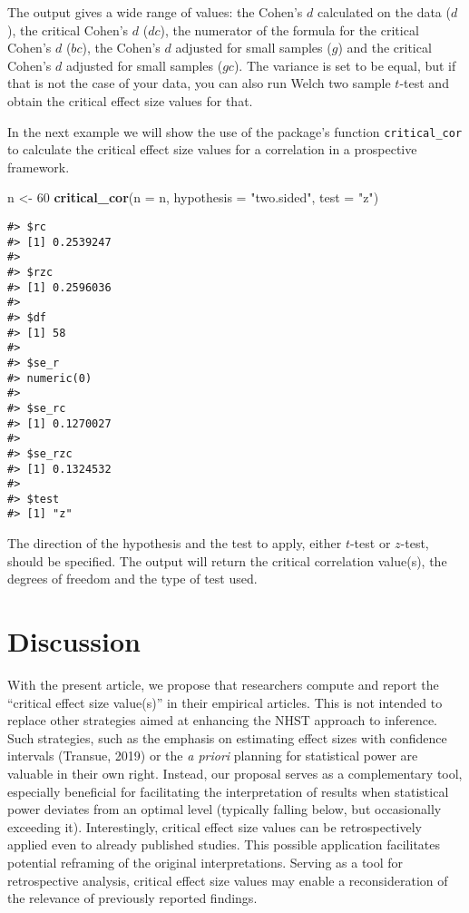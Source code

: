 \documentclass[
  man]{apa7}
\newenvironment{Shaded}{\begin{snugshade}}{\end{snugshade}}
\newcommand{\AttributeTok}[1]{\textcolor[rgb]{0.13,0.29,0.53}{#1}}
\newcommand{\DecValTok}[1]{\textcolor[rgb]{0.00,0.00,0.81}{#1}}
\newcommand{\FunctionTok}[1]{\textcolor[rgb]{0.13,0.29,0.53}{\textbf{#1}}}
\newcommand{\NormalTok}[1]{#1}
\newcommand{\OtherTok}[1]{\textcolor[rgb]{0.56,0.35,0.01}{#1}}
\newcommand{\StringTok}[1]{\textcolor[rgb]{0.31,0.60,0.02}{#1}}
\begin{document}
\normalsize

The output gives a wide range of values: the Cohen's \(d\) calculated on the data (\(d\)), the critical Cohen's \(d\) (\(dc\)), the numerator of the formula for the critical Cohen's \(d\) (\(bc\)), the Cohen's \(d\) adjusted for small samples (\(g\)) and the critical Cohen's \(d\) adjusted for small samples (\(gc\)). The variance is set to be equal, but if that is not the case of your data, you can also run Welch two sample \(t\)-test and obtain the critical effect size values for that.

In the next example we will show the use of the package's function \texttt{critical\_cor} to calculate the critical effect size values for a correlation in a prospective framework.

\footnotesize

\begin{Shaded}
\begin{Highlighting}[]
\NormalTok{n }\OtherTok{\textless{}{-}} \DecValTok{60}
\FunctionTok{critical\_cor}\NormalTok{(}\AttributeTok{n =}\NormalTok{ n, }\AttributeTok{hypothesis =} \StringTok{"two.sided"}\NormalTok{, }\AttributeTok{test =} \StringTok{"z"}\NormalTok{)}
\end{Highlighting}
\end{Shaded}

\begin{verbatim}
#> $rc
#> [1] 0.2539247
#> 
#> $rzc
#> [1] 0.2596036
#> 
#> $df
#> [1] 58
#> 
#> $se_r
#> numeric(0)
#> 
#> $se_rc
#> [1] 0.1270027
#> 
#> $se_rzc
#> [1] 0.1324532
#> 
#> $test
#> [1] "z"
\end{verbatim}

\normalsize

The direction of the hypothesis and the test to apply, either \(t\)-test or \(z\)-test, should be specified. The output will return the critical correlation value(s), the degrees of freedom and the type of test used.

\hypertarget{discussion}{%
\section{Discussion}\label{discussion}}

With the present article, we propose that researchers compute and report the ``critical effect size value(s)'' in their empirical articles. This is not intended to replace other strategies aimed at enhancing the NHST approach to inference. Such strategies, such as the emphasis on estimating effect sizes with confidence intervals (Transue, 2019) or the \textit{a priori} planning for statistical power are valuable in their own right. Instead, our proposal serves as a complementary tool, especially beneficial for facilitating the interpretation of results when statistical power deviates from an optimal level (typically falling below, but occasionally exceeding it). Interestingly, critical effect size values can be retrospectively applied even to already published studies. This possible application facilitates potential reframing of the original interpretations. Serving as a tool for retrospective analysis, critical effect size values may enable a reconsideration of the relevance of previously reported findings.
\end{document}
